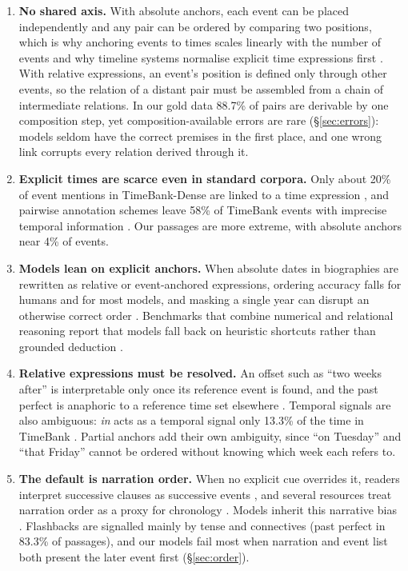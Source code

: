 \documentclass[11pt]{article}
\begin{document}
\begin{enumerate}[leftmargin=*,itemsep=1pt,topsep=2pt]
\item \textbf{No shared axis.} With absolute anchors, each event can be placed independently and any pair can be ordered by comparing two positions, which is why anchoring events to times scales linearly with the number of events \citep{reimers-etal-2016-temporal} and why timeline systems normalise explicit time expressions first \citep{do-etal-2012-joint}. With relative expressions, an event's position is defined only through other events, so the relation of a distant pair must be assembled from a chain of intermediate relations. In our gold data 88.7\% of pairs are derivable by one composition step, yet composition-available errors are rare (\S\ref{sec:errors}): models seldom have the correct premises in the first place, and one wrong link corrupts every relation derived through it.
\item \textbf{Explicit times are scarce even in standard corpora.} Only about 20\% of event mentions in TimeBank-Dense are linked to a time expression \citep{wen-ji-2021-utilizing}, and pairwise annotation schemes leave 58\% of TimeBank events with imprecise temporal information \citep{reimers-etal-2016-temporal}. Our passages are more extreme, with absolute anchors near 4\% of events.
\item \textbf{Models lean on explicit anchors.} When absolute dates in biographies are rewritten as relative or event-anchored expressions, ordering accuracy falls for humans and for most models, and masking a single year can disrupt an otherwise correct order \citep{sun-etal-2025-time}. Benchmarks that combine numerical and relational reasoning report that models fall back on heuristic shortcuts rather than grounded deduction \citep{qian-etal-2026-beyond}.
\item \textbf{Relative expressions must be resolved.} An offset such as ``two weeks after'' is interpretable only once its reference event is found, and the past perfect is anaphoric to a reference time set elsewhere \citep{kehler-1994-temporal}. Temporal signals are also ambiguous: \emph{in} acts as a temporal signal only 13.3\% of the time in TimeBank \citep{derczynski2012corpusbasedstudytemporalsignals}. Partial anchors add their own ambiguity, since ``on Tuesday'' and ``that Friday'' cannot be ordered without knowing which week each refers to.
\item \textbf{The default is narration order.} When no explicit cue overrides it, readers interpret successive clauses as successive events \citep{kehler-1994-temporal}, and several resources treat narration order as a proxy for chronology \citep{yao-huang-2018-temporal,lin-etal-2021-conditional}. Models inherit this narrative bias \citep{fang-etal-2024-getting}. Flashbacks are signalled mainly by tense and connectives (past perfect in 83.3\% of passages), and our models fail most when narration and event list both present the later event first (\S\ref{sec:order}).

\end{enumerate}
\end{document}
